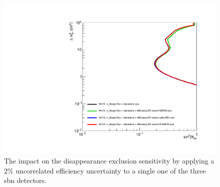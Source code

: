 \begin{figure}[h!]
    \centering
    \includegraphics[width = \largefigwidth]{figures-chap6/exclusion_contours/efficiency_systematics/nue_disapp_2pct_uncor_per_detector.pdf}
    \caption[\nue disapp with a 2\% uncorrelated efficiency systematic for one detector only.]{The impact on the \nue disappearance exclusion sensitivity by applying a 2\% uncorrelated efficiency uncertainty to a single one of the three \gls{sbn} detectors.}
    \label{fig:my_label}
\end{figure}



